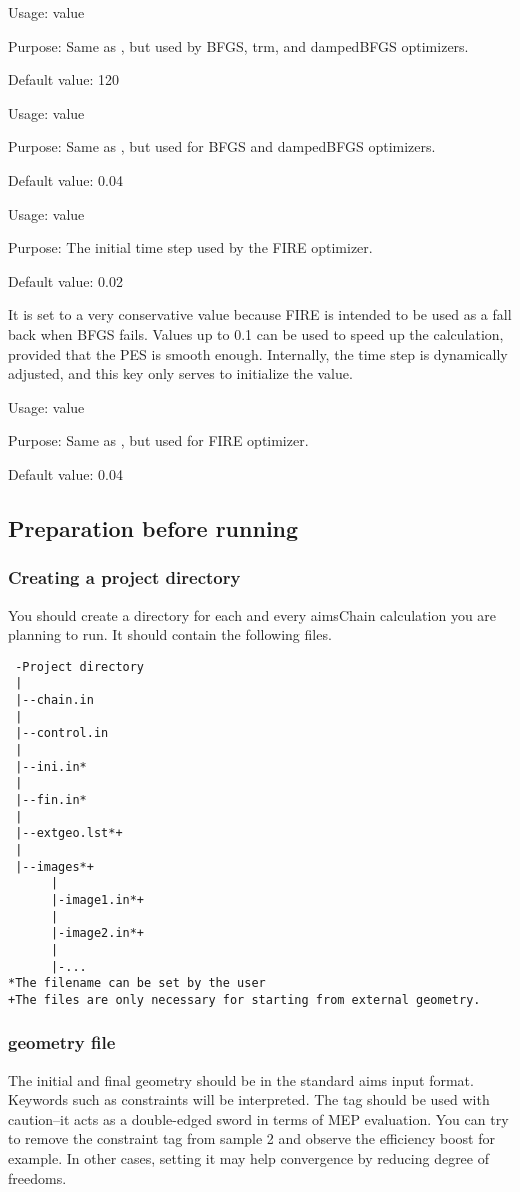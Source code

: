 {
Usage:  value


Purpose: Same as , but used by BFGS, trm, and dampedBFGS optimizers.


Default value: 120
}

{
Usage:  value


Purpose: Same as , but used for BFGS and dampedBFGS optimizers.


Default value: 0.04
}

{
Usage:  value


Purpose: The initial time step used by the FIRE optimizer. 

Default value: 0.02
}
It is set to a very conservative value because FIRE is intended to be used as a fall back when BFGS fails. Values up to 0.1 can be used to speed up the calculation, provided that the PES is smooth enough. Internally, the time step is dynamically adjusted, and this key only serves to initialize the value. 

{
Usage:  value


Purpose: Same as , but used for FIRE optimizer.


Default value: 0.04
}

\subsection{Preparation before running}
\subsubsection*{Creating a project directory}
You should create a directory for each and every aimsChain calculation you are planning to run. It should contain the following files.
\begin{verbatim}
 -Project directory
 |
 |--chain.in
 |
 |--control.in
 |
 |--ini.in*
 |
 |--fin.in*
 |
 |--extgeo.lst*+
 |
 |--images*+
      |
      |-image1.in*+
      |
      |-image2.in*+
      |
      |-... 
*The filename can be set by the user
+The files are only necessary for starting from external geometry. 
\end{verbatim}

\subsubsection*{geometry file}
The initial and final geometry should be in the standard aims input format. Keywords such as constraints will be interpreted. The  tag should be used with caution--it acts as a double-edged sword in terms of MEP evaluation. You can try to remove the constraint tag from sample 2 and observe the efficiency boost for example. In other cases, setting it may help convergence by reducing degree of freedoms.  

